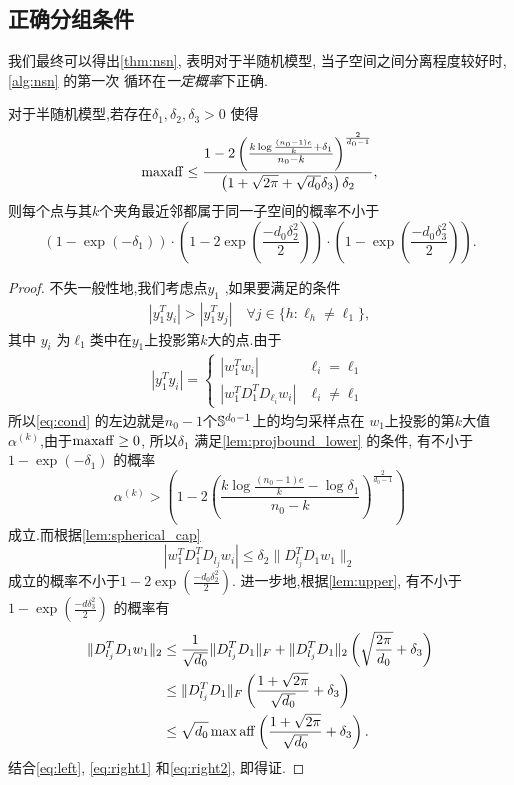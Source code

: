 \subsection{正确分组条件}
我们最终可以得出\autoref{thm:nsn}, 表明对于半随机模型, 
当子空间之间分离程度较好时,\autoref{alg:nsn} 的第一次
循环在\emph{一定概率}下正确.
\begin{theorem} \label{thm:nsn}
  对于半随机模型,若存在\(\delta_1, \delta_2, \delta_3 >0\) 使得
  \[\maff \le \frac{1-2\left( \frac{k\log \frac{(n_0-1)e}{k}+ \delta_1}
  {n_0-k} \right)^{\frac{2}{d_0-1}}}{\left( 1+\sqrt{2\pi}+\sqrt{d_0}\delta_3\right)\delta_2}, \]
  则每个点与其\(k\)个夹角最近邻都属于同一子空间的概率不小于
  \[
    \left(1-\exp(-\delta_1)\right)\cdot
    \left(1-2\exp\left(\frac{-d_0 \delta_2^2}{2}\right)\right) 
    \cdot\left(1-\exp\left(\frac{-d_0 \delta_3^2}{2}\right)\right).
  \]
\end{theorem}
\begin{proof}
  不失一般性地,我们考虑点\(y_1\) ,如果要满足的条件
  \begin{align}
    |y_1^T y_i|>|y_1^T y_j| \quad \forall j \in \{h:\ell_h \ne \ell_1\},
    \label{eq:cond}
  \end{align}
  其中 \(y_i\) 为\(\ell_1\)类中在\(y_1\)上投影第\(k\)大的点.由于
  \begin{align*}
    |y_1^T y_i|=
    \begin{cases}
      |w_1^T w_i| & \ell_i = \ell_1 \\
      |w_1^T D_1^T D_{\ell_i}w_i| & \ell_i \ne \ell_1
    \end{cases}
  \end{align*}
  所以\eqref{eq:cond} 的左边就是\(n_0-1\)个\(\S^{d_0-1}\)上的均匀采样点在
  \(w_1\)上投影的第\(k\)大值\(\alpha^{(k)}\),由于\(\maff\ge 0\), 所以\(\delta_1\)
  满足\autoref{lem:projbound_lower} 的条件, 有不小于\(1-\exp(-\delta_1)\)
  的概率
  \begin{equation}
    \alpha^{(k)}>\left( 1-2\left(\frac{k\log \frac{(n_0-1)e}{k}-\log
  \delta_1}{n_0-k}
    \right)^{\frac{2}{d_0-1}}\right)
    \label{eq:left}
  \end{equation}
  成立.而根据\autoref{lem:spherical_cap} 
  \begin{equation} \label{eq:right1}
    |w_1^T D_1^T D_{l_j}w_i| \le \delta_2 \|D_{l_j}^T D_1 w_1\|_2
  \end{equation}
  成立的概率不小于\(1-2\exp(\frac{-d_0 \delta_2^2}{2})\).
  进一步地,根据\autoref{lem:upper}, 有不小于\(1-\exp(\frac{-d\delta_3^2}{2})\)
  的概率有
  \begin{align}
    \|D_{l_j}^T D_1 w_1\|_2 &\le \frac{1}{\sqrt{d_0}} \|D_{l_j}^TD_1\|_F +
    \|D_{l_j}^T D_1\|_2 \left( \sqrt{\frac{2\pi}{d_0}}+\delta_3 \right) \nonumber\\
    &\le \|D_{l_j}^TD_1\|_F \left(\frac{1+\sqrt{2\pi}}{\sqrt{d_0}}+\delta_3
    \right) \nonumber \\
    &\le \sqrt{d_0} \max \aff \left(\frac{1+\sqrt{2\pi}}{\sqrt{d_0}}+\delta_3
    \right).
    \label{eq:right2}
  \end{align}
  结合\eqref{eq:left}, \eqref{eq:right1} 和\eqref{eq:right2}, 即得证.
\end{proof}

